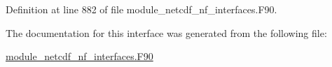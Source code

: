 Definition at line 882 of file module\+\_\+netcdf\+\_\+nf\+\_\+interfaces.\+F90.



The documentation for this interface was generated from the following file\+:\begin{DoxyCompactItemize}
\item 
\hyperlink{module__netcdf__nf__interfaces_8F90}{module\+\_\+netcdf\+\_\+nf\+\_\+interfaces.\+F90}\end{DoxyCompactItemize}
